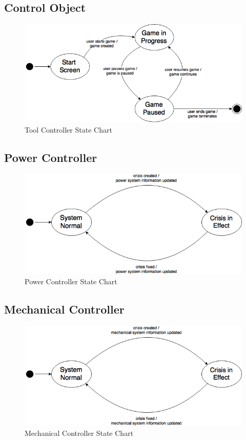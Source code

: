 \documentclass[12pt, titlepage]{article}
\begin{document}
\subsection*{Control Object}
\begin{figure}[H]
\centering
\includegraphics[width=120mm]{ControlObject.png}
\caption{Tool Controller State Chart}
\end{figure}

\subsection*{Power Controller}
\begin{figure}[H]
\centering
\includegraphics[width=120mm]{PowerController.png}
\caption{Power Controller State Chart}
\end{figure}

\subsection*{Mechanical Controller}
\begin{figure}[H]
\centering
\includegraphics[width=120mm]{MechanicalController.png}
\caption{Mechanical Controller State Chart}
\end{figure}
\end{document}
